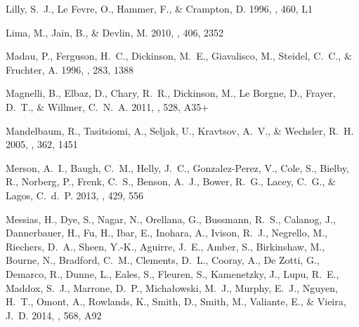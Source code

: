 \documentclass[iop]{emulateapj}
\begin{document}
\begin{thebibliography}{107}
{Lilly}, S.~J., {Le Fevre}, O., {Hammer}, F., \& {Crampton}, D. 1996, \apjl,
  460, L1

{Lima}, M., {Jain}, B., \& {Devlin}, M. 2010, \mnras, 406, 2352

{Madau}, P., {Ferguson}, H.~C., {Dickinson}, M.~E., {Giavalisco}, M.,
  {Steidel}, C.~C., \& {Fruchter}, A. 1996, \mnras, 283, 1388

{Magnelli}, B., {Elbaz}, D., {Chary}, R.~R., {Dickinson}, M., {Le Borgne}, D.,
  {Frayer}, D.~T., \& {Willmer}, C.~N.~A. 2011, \aap, 528, A35+

{Mandelbaum}, R., {Tasitsiomi}, A., {Seljak}, U., {Kravtsov}, A.~V., \&
  {Wechsler}, R.~H. 2005, \mnras, 362, 1451

{Merson}, A.~I., {Baugh}, C.~M., {Helly}, J.~C., {Gonzalez-Perez}, V., {Cole},
  S., {Bielby}, R., {Norberg}, P., {Frenk}, C.~S., {Benson}, A.~J., {Bower},
  R.~G., {Lacey}, C.~G., \& {Lagos}, C.~d.~P. 2013, \mnras, 429, 556

{Messias}, H., {Dye}, S., {Nagar}, N., {Orellana}, G., {Bussmann}, R.~S.,
  {Calanog}, J., {Dannerbauer}, H., {Fu}, H., {Ibar}, E., {Inohara}, A.,
  {Ivison}, R.~J., {Negrello}, M., {Riechers}, D.~A., {Sheen}, Y.-K.,
  {Aguirre}, J.~E., {Amber}, S., {Birkinshaw}, M., {Bourne}, N., {Bradford},
  C.~M., {Clements}, D.~L., {Cooray}, A., {De Zotti}, G., {Demarco}, R.,
  {Dunne}, L., {Eales}, S., {Fleuren}, S., {Kamenetzky}, J., {Lupu}, R.~E.,
  {Maddox}, S.~J., {Marrone}, D.~P., {Micha{\l}owski}, M.~J., {Murphy}, E.~J.,
  {Nguyen}, H.~T., {Omont}, A., {Rowlands}, K., {Smith}, D., {Smith}, M.,
  {Valiante}, E., \& {Vieira}, J.~D. 2014, \aap, 568, A92


\end{thebibliography}
\end{document}
